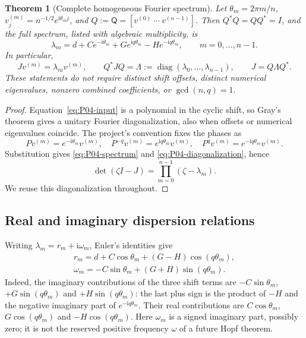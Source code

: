 \documentclass[11pt]{article}
\newcommand{\ii}{\mathrm{i}}
\newcommand{\Fourier}{\mathsf{Q}}
\DeclareMathOperator{\diag}{diag}
\newtheorem{theorem}{Theorem}[section]
\theoremstyle{definition}
\theoremstyle{remark}
\begin{document}
\begin{theorem}[Complete homogeneous Fourier spectrum]
\label{thm:P04-spectrum}
Let $\theta_m=2\pi m/n$, $v^{(m)}_j=n^{-1/2}e^{\ii\theta_m j}$,
and $Q:=\Fourier=[v^{(0)}\ \cdots\ v^{(n-1)}]$.
Then $Q^*Q=QQ^*=I$, and the full spectrum, listed with algebraic
multiplicity, is
\begin{equation}
 \boxed{\lambda_m=d+Ce^{-\ii\theta_m}
                      +Ge^{\ii q\theta_m}-He^{-\ii q\theta_m},
           \qquad m=0,\ldots,n-1.}
 \label{eq:P04-spectrum}
\end{equation}
In particular,
\begin{equation}
 Jv^{(m)}=\lambda_m v^{(m)},\qquad
 Q^*JQ=\Lambda:=\diag(\lambda_0,\ldots,\lambda_{n-1}),\qquad
 J=Q\Lambda Q^*.
 \label{eq:P04-diagonalization}
\end{equation}
These statements do not require distinct shift offsets, distinct
numerical eigenvalues, nonzero combined coefficients, or
$\gcd(n,q)=1$.
\end{theorem}
\begin{proof}
Equation~\eqref{eq:P04-input} is a polynomial in the cyclic shift,
so Gray's theorem \cite[Theorem~3.1]{Gray2006} gives a unitary Fourier
diagonalization, also when offsets or numerical eigenvalues coincide.
The project's convention fixes the phases as
\begin{equation}
 Pv^{(m)}=e^{-\ii\theta_m}v^{(m)},\quad
 P^{-q}v^{(m)}=e^{\ii q\theta_m}v^{(m)},\quad
 P^qv^{(m)}=e^{-\ii q\theta_m}v^{(m)}.
 \label{eq:P04-shifts}
\end{equation}
Substitution gives \eqref{eq:P04-spectrum} and
\eqref{eq:P04-diagonalization}, hence
\begin{equation}
 \det(\zeta I-J)=\prod_{m=0}^{n-1}(\zeta-\lambda_m).
 \label{eq:P04-characteristic}
\end{equation}
We reuse this diagonalization throughout.
\end{proof}

\subsection{Real and imaginary dispersion relations}

Writing $\lambda_m=r_m+\ii\omega_m$, Euler's identities give
\begin{align}
 \boxed{r_m=d+C\cos\theta_m+(G-H)\cos(q\theta_m),}
   \label{eq:P04-real}\\
 \boxed{\omega_m=-C\sin\theta_m+(G+H)\sin(q\theta_m).}
   \label{eq:P04-imag}
\end{align}
Indeed, the imaginary contributions of the three shift terms are
$-C\sin\theta_m$, $+G\sin(q\theta_m)$ and
$+H\sin(q\theta_m)$: the last plus sign is the product of
$-H$ and the negative imaginary part of $e^{-\ii q\theta_m}$.
Their real contributions are $C\cos\theta_m$,
$G\cos(q\theta_m)$ and $-H\cos(q\theta_m)$.
Here $\omega_m$ is a signed imaginary part, possibly zero; it is not
the reserved positive frequency $\omega$ of a future Hopf theorem.
\end{document}
